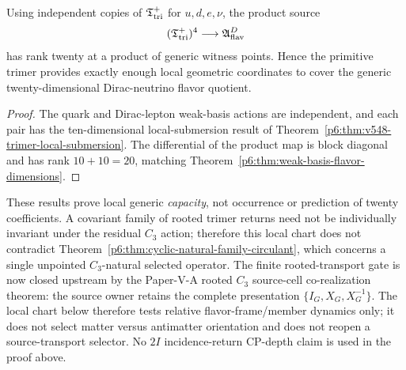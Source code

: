 \documentclass[11pt,a4paper]{article}
\begin{document}
\begin{corollary}
\label{p6:cor:v548-dirac-twenty-dimensional-trimer-chart}
Using independent copies of $\mathfrak T_{\rm tri}^{+}$ for
$u,d,e,\nu$, the product source
\[
 (\mathfrak T_{\rm tri}^{+})^4
 \longrightarrow\mathfrak A_{\rm flav}^{D}
\]
has rank twenty at a product of generic witness points.  Hence the primitive
trimer provides exactly enough local geometric coordinates to cover the
generic twenty-dimensional Dirac-neutrino flavor quotient.
\end{corollary}
\begin{proof}
The quark and Dirac-lepton weak-basis actions are independent, and each pair
has the ten-dimensional local-submersion result of
Theorem~\ref{p6:thm:v548-trimer-local-submersion}.  The differential of the
product map is block diagonal and has rank $10+10=20$, matching
Theorem~\ref{p6:thm:weak-basis-flavor-dimensions}.
\end{proof}

\begin{remark}
\label{p6:rem:v548-trimer-capacity-occurrence-firewall}
These results prove local generic \emph{capacity}, not occurrence or
prediction of twenty coefficients.  A covariant family of rooted trimer
returns need not be individually invariant under the residual $C_3$ action;
therefore this local chart does not contradict
Theorem~\ref{p6:thm:cyclic-natural-family-circulant}, which concerns a single
unpointed $C_3$-natural selected operator.  The finite rooted-transport gate is now closed upstream by the Paper-V-A
rooted $C_3$ source-cell co-realization theorem: the source owner retains the
complete presentation $\{I_G,X_G,X_G^{-1}\}$.  The local chart below therefore
tests relative flavor-frame/member dynamics only; it does not select matter
versus antimatter orientation and does not reopen a source-transport selector.
No $2I$ incidence-return
CP-depth claim is used in the proof above.
\end{remark}
\end{document}
